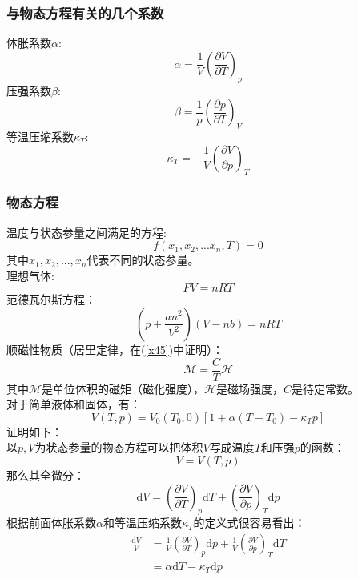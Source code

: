 \documentclass[12pt]{article}
\begin{document}
\subsubsection{与物态方程有关的几个系数}
\noindent
体胀系数$\alpha$:
\begin{equation}
	\alpha=\frac{1}{V}(\frac{\partial V}{\partial T})_p
\end{equation}	
压强系数$\beta$:
\begin{equation}
	\beta=\frac{1}{p}(\frac{\partial p}{\partial T})_V
\end{equation}	
等温压缩系数$\kappa_T$:
\begin{equation}
	\kappa_T=-\frac{1}{V}(\frac{\partial V}{\partial p})_T
\end{equation}	
\subsubsection{物态方程}
\noindent
温度与状态参量之间满足的方程:
\begin{equation}
	f(x_1,x_2,...x_n,T)=0
\end{equation}
其中$x_1,x_2,...,x_n$代表不同的状态参量。\\
 理想气体:
\begin{equation}
	PV=nRT
\end{equation}
范德瓦尔斯方程：
\begin{equation}
	(p+\frac{an^2}{V^2})(V-nb)=nRT
\end{equation}
顺磁性物质（居里定律，在(\ref{x45})中证明）：
\begin{equation}
	\mathscr{M}=\frac{C}{T} \mathscr{H}
	\label{x44}
\end{equation}
其中$\mathscr{M}$是单位体积的磁矩（磁化强度），$\mathscr{H}$是磁场强度，$C$是待定常数。\\
对于简单液体和固体，有：
\begin{equation}
	V(T,p)=V_0(T_0,0)[1+\alpha (T-T_0)-\kappa_T p]
\end{equation}
证明如下：\\
以$p,V$为状态参量的物态方程可以把体积$V$写成温度$T$和压强$p$的函数：
\begin{equation}
	V=V(T,p)
\end{equation}
那么其全微分：
\begin{equation}
	\mathrm{d}V=(\frac{\partial V}{\partial T})_p\mathrm{d}T+(\frac{\partial V}{\partial p})_T\mathrm{d}p
\end{equation}
根据前面体胀系数$\alpha$和等温压缩系数$\kappa_T$的定义式很容易看出：
\begin{equation}
\begin{split}	
\frac{\mathrm{d}V}{V}&=\frac{1}{V}(\frac{\partial V}{\partial T})_p\mathrm{d}p+\frac{1}{V}(\frac{\partial V}{\partial p})_T\mathrm{d}T \\
&=\alpha \mathrm{d}T-\kappa_T \mathrm{d}p
\end{split}
\end{equation}
\end{document}
